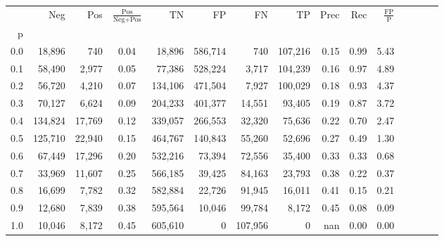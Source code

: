 \begin{tabular}{rrrcrrrrrrrrrrr}
\toprule
{} &      Neg &     Pos & $\frac{\text{Pos}}{\text{Neg}+\text{Pos}}$ &       TN &       FP &       FN &       TP &  Prec &   Rec & $\frac{\text{FP}}{\text{P}}$ \\
p   &          &         &                                            &          &          &          &          &       &       &                              \\
\midrule
0.0 &   18,896 &     740 &                                       0.04 &   18,896 &  586,714 &      740 &  107,216 &  0.15 &  0.99 &                         5.43 \\
0.1 &   58,490 &   2,977 &                                       0.05 &   77,386 &  528,224 &    3,717 &  104,239 &  0.16 &  0.97 &                         4.89 \\
0.2 &   56,720 &   4,210 &                                       0.07 &  134,106 &  471,504 &    7,927 &  100,029 &  0.18 &  0.93 &                         4.37 \\
0.3 &   70,127 &   6,624 &                                       0.09 &  204,233 &  401,377 &   14,551 &   93,405 &  0.19 &  0.87 &                         3.72 \\
0.4 &  134,824 &  17,769 &                                       0.12 &  339,057 &  266,553 &   32,320 &   75,636 &  0.22 &  0.70 &                         2.47 \\
0.5 &  125,710 &  22,940 &                                       0.15 &  464,767 &  140,843 &   55,260 &   52,696 &  0.27 &  0.49 &                         1.30 \\
0.6 &   67,449 &  17,296 &                                       0.20 &  532,216 &   73,394 &   72,556 &   35,400 &  0.33 &  0.33 &                         0.68 \\
0.7 &   33,969 &  11,607 &                                       0.25 &  566,185 &   39,425 &   84,163 &   23,793 &  0.38 &  0.22 &                         0.37 \\
0.8 &   16,699 &   7,782 &                                       0.32 &  582,884 &   22,726 &   91,945 &   16,011 &  0.41 &  0.15 &                         0.21 \\
0.9 &   12,680 &   7,839 &                                       0.38 &  595,564 &   10,046 &   99,784 &    8,172 &  0.45 &  0.08 &                         0.09 \\
1.0 &   10,046 &   8,172 &                                       0.45 &  605,610 &        0 &  107,956 &        0 &   nan &  0.00 &                         0.00 \\
\bottomrule
\end{tabular}
